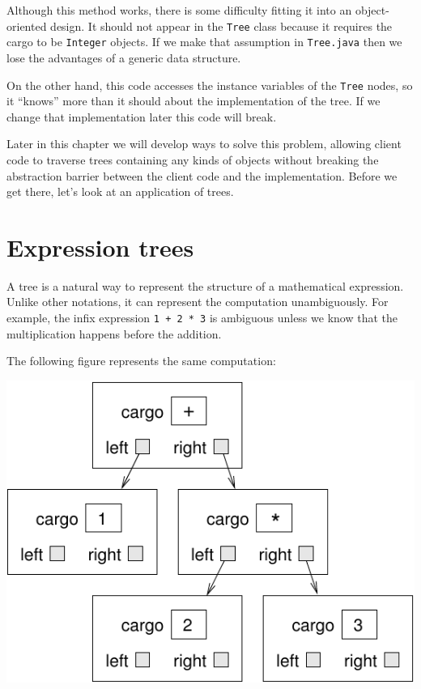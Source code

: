 \documentclass[12pt]{book}
\theoremstyle{exercise}
\begin{document}

Although this method works, there is some difficulty fitting it into
an object-oriented design.
It should not appear in the {\tt Tree} class because it
requires the cargo to be {\tt Integer} objects.  If we make that
assumption in {\tt Tree.java} then we lose the advantages of a generic
data structure.

On the other hand, this code accesses the instance variables
of the {\tt Tree} nodes, so it ``knows'' more than it should about
the implementation of the tree.  If we change that implementation
later this code will break.

Later in this chapter we will develop ways to solve this problem,
allowing client code to traverse trees containing any kinds of objects
without breaking the abstraction barrier between the client code and
the implementation.  Before we get there, let's look at an
application of trees.


\section {Expression trees}

A tree is a natural way to represent the structure of a
mathematical expression.
Unlike other notations, it can represent the computation unambiguously.
For example, the infix expression {\tt 1 + 2 * 3} is ambiguous unless
we know that the multiplication happens before the addition.

The following figure represents the same computation:

\includegraphics{figs/tree2.pdf}
\end{document}
